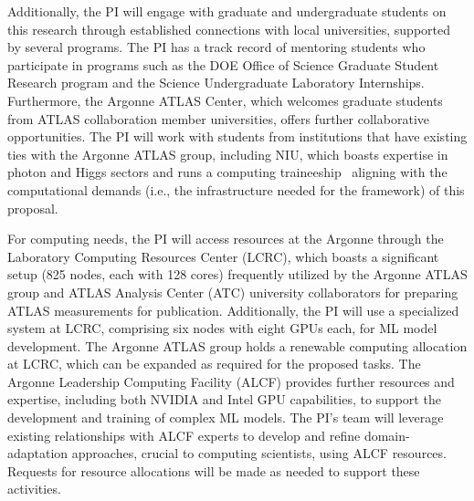 \documentclass[letter, USenglish, 11pt, subfigure]{article}
\begin{document}
Additionally, the PI will engage with graduate and undergraduate students on this research through established connections with local universities, supported by several programs. The PI has a track record of mentoring students who participate in programs such as the DOE Office of Science Graduate Student Research program and the Science Undergraduate Laboratory Internships. Furthermore, the Argonne ATLAS Center, which welcomes graduate students from ATLAS collaboration member universities, offers further collaborative opportunities. The PI will work with students from institutions that have existing ties with the Argonne ATLAS group, including NIU, which boasts expertise in photon and Higgs sectors and runs a computing traineeship~\cite{C2THEP2} aligning with the computational demands (i.e., the infrastructure needed for the framework) of this proposal.

For computing needs, the PI will access resources at the Argonne through the Laboratory Computing Resources Center (LCRC), which boasts a significant setup (825 nodes, each with 128 cores) frequently utilized by the Argonne ATLAS group and ATLAS Analysis Center (ATC) university collaborators for preparing ATLAS measurements for publication. Additionally, the PI will use a specialized system at LCRC, comprising six nodes with eight GPUs each, for ML model development. The Argonne ATLAS group holds a renewable computing allocation at LCRC, which can be expanded as required for the proposed tasks. The Argonne Leadership Computing Facility (ALCF) provides further resources and expertise, including both NVIDIA and Intel GPU capabilities, to support the development and training of complex ML models. The PI's team will leverage existing relationships with ALCF experts to develop and refine domain-adaptation approaches, crucial to computing scientists, using ALCF resources. Requests for resource allocations will be made as needed to support these activities.
\end{document}
